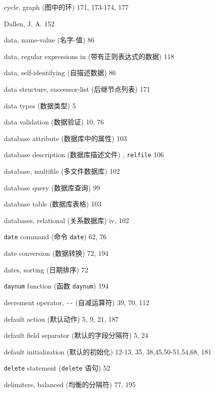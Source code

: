 \begin{multicols}{2}
\hangindent=2pc  cycle, graph (图中的环) 171, 173-174, 177

\hangindent=2pc  Dallen, J. A. 152

\hangindent=2pc  data, name-value (\mbox{名字}-值) 86

\hangindent=2pc  data, regular expressions in
(带有正则表达式的数据) 118

\hangindent=2pc  data, self-identifying (自描述数据) 86

\hangindent=2pc  data structure, successor-list (后继节点列表) 171

\hangindent=2pc  data types (数据类型) 5

\hangindent=2pc  data validation (数据验证) 10, 76

\hangindent=2pc  database attribute (数据库中的属性) 103

\hangindent=2pc  database description (数据库描述文件) ,
\verb'relfile' 106

\hangindent=2pc  database, multifile (多文件数据库) 102

\hangindent=2pc  database query (数据库查询) 99

\hangindent=2pc  database table (数据库表格) 103

\hangindent=2pc  databases, relational (关系数据库) iv, 102


\hangindent=2pc  \verb'date' command (命令 \verb'date') 62, 76

\hangindent=2pc  date conversion (数据转换) 72, 194

\hangindent=2pc  dates, sorting (日期排序) 72

\hangindent=2pc  \verb'daynum' function (函数 \verb'daynum') 194

\hangindent=2pc  decrement operator, \verb'--' (自减运算符) 39, 70, 112

\hangindent=2pc  default action (默认动作) 5, 9, 21, 187

\hangindent=2pc  default field separator (默认的字段分隔符) 5, 24

\hangindent=2pc  default initialization (默认的初始化) 12-13, 35, 38,45,50-51,54,68, 181

\hangindent=2pc  \verb'delete' statement (\verb'delete' 语句) 52

\hangindent=2pc  delimiters, balanced (均衡的分隔符) 77, 195


\end{multicols}
